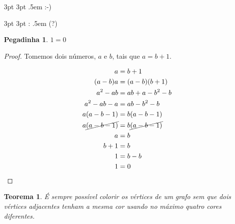 {3pt} %
{3pt} %
{\itshape} %
{} %
{\bfseries} %
{} %
{.5em} %
{ :-)\space} %

{3pt} %
{3pt} %
{\itshape} %
{} %
{\bfseries} %
{:} %
{.5em} %
{\space(?)} %

\theoremstyle{smile} %
\newtheorem{absurd}{Pegadinha}

\begin{absurd}\label{thm:doisum}
  $1=0$
\end{absurd}

\begin{proof}
Tomemos dois números, $a$ e $b$, tais que $a=b+1$.

\begin{displaymath}
  \begin{split}
    a &= b+1 \\
    (a-b)a &= (a-b)(b+1) \\
    a^2 - ab &= ab + a -b^2 -b \\
    a^2 -ab -a &= ab -b^2 -b \\
    a(a-b-1) &= b(a-b-1) \\
    a \cancel{(a-b-1)} &= b \cancel{(a-b-1)} \\
    a &= b \\
    b+1 &= b \\
    1 &= b-b \\
    1 &= 0
  \end{split}
\end{displaymath}
\end{proof}

\theoremstyle{plain} %
\newtheorem{theorem}{Teorema}

\begin{theorem}
  \label{thm:graphcolor}
  É sempre possível colorir os vértices de um grafo sem que dois vértices
  adjacentes tenham a mesma cor usando no máximo quatro cores diferentes.
\end{theorem}

